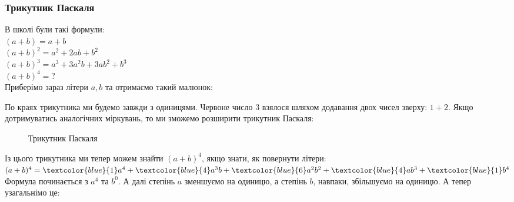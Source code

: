 \documentclass[a4paper, 14pt]{article}
\theoremstyle{theoremdd}
\theoremstyle{theoremdd}
\theoremstyle{theoremdd}
\theoremstyle{theoremdd}
\theoremstyle{theoremdd}
\theoremstyle{theoremdd}
\theoremstyle{theoremdd}
\theoremstyle{theoremdd}
\begin{document}
	\subsubsection*{Трикутник Паскаля}
	В школі були такі формули:\\
	$(a+b) = a + b$\\
	$(a+b)^2 = a^2+2ab + b^2$\\
	$(a+b)^3 = a^3 + 3a^2b + 3ab^2 + b^3$\\
	$(a+b)^4 = ?$\\
	Приберімо зараз літери $a,b$ та отримаємо такий малюнок:
\begin{figure}[H]
\centering
\end{figure}
	По краях трикутника ми будемо завжди з одиницями. Червоне число $3$ взялося шляхом додавання двох чисел зверху: $1 + 2$. Якщо дотримуватись аналогічних міркувань, то ми зможемо розширити трикутник Паскаля:
\begin{figure}[H]
\centering
	\caption*{Трикутник Паскаля}
\end{figure}
	Із цього трикутника ми тепер можем знайти $(a+b)^4$, якщо знати, як повернути літери:\\
	$(a+b)^4 = \textcolor{blue}{1} a^4 + \textcolor{blue}{4}a^3 b + \textcolor{blue}{6} a^2  b^2 + \textcolor{blue}{4}a b^3 + \textcolor{blue}{1} b^4$\\
	Формула починається з $a^4$ та $b^0$. А далі степінь $a$ зменшуємо на одиницю, а степінь $b$, навпаки, збільшуємо на одиницю. А тепер узагальнімо це:
	
\end{document}
